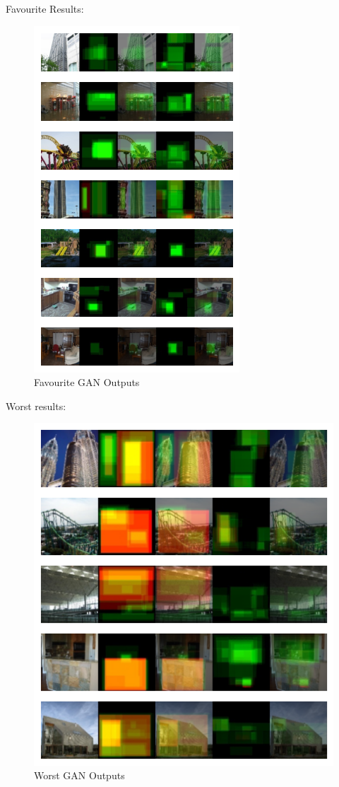 \documentclass{UoYCSproject}
\begin{document}
Favourite Results:
\begin{figure}[ht]
    \centering
    \includegraphics[]{Good GAN Outputs}
    \caption{Favourite GAN Outputs}
    \label{fig:GANGoodOutput}
\end{figure}

Worst results:
\begin{figure}[ht]
    \centering
    \includegraphics[width=\linewidth]{Worst GAN Outputs}
    \caption{Worst GAN Outputs}
    \label{fig:GANWorstOutput}
\end{figure}
\end{document}
